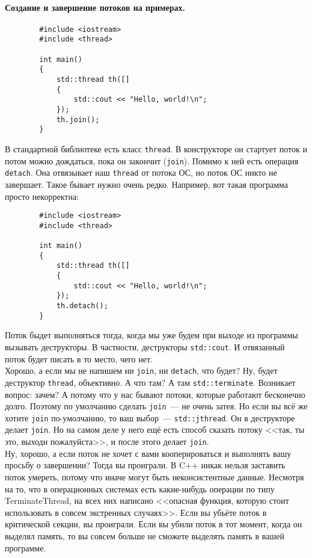 \documentclass{article}
\begin{document}
    \paragraph{Создание и завершение потоков на примерах.}
    \begin{verbatim}
        #include <iostream>
        #include <thread>

        int main()
        {
            std::thread th([]
            {
                std::cout << "Hello, world!\n";
            });
            th.join();
        }
    \end{verbatim}
    В стандартной библиотеке есть класс \texttt{thread}. В конструкторе он стартует поток и потом можно дождаться, пока он закончит (\texttt{join}). Помимо к ней есть операция \texttt{detach}. Она отвязывает наш \texttt{thread} от потока ОС, но поток ОС никто не завершает. Такое бывает нужно очень редко. Например, вот такая программа просто некорректна:
    \begin{verbatim}
        #include <iostream>
        #include <thread>
        
        int main()
        {
            std::thread th([]
            {
                std::cout << "Hello, world!\n";
            });
            th.detach();
        }
    \end{verbatim}
    Поток быдет выполняться тогда, когда мы уже будем при выходе из программы вызывать деструкторы. В частности, деструкторы \texttt{std::cout}. И отвязанный поток будет писать в то место, чего нет.\\
    Хорошо, а если мы не напишем ни \texttt{join}, ни \texttt{detach}, что будет? Ну, будет деструктор \texttt{thread}, объективно. А что там? А там \texttt{std::terminate}. Возникает вопрос: зачем? А потому что у нас бывают потоки, которые работают бесконечно долго. Поэтому по умолчанию сделать \texttt{join}~--- не очень затея. Но если вы всё же хотите \texttt{join} по-умолчанию, то ваш выбор~--- \texttt{std::jthread}. Он в деструкторе делает \texttt{join}. Но на самом деле у него ещё есть способ сказать потоку <<так, ты это, выходи пожалуйста>>, и после этого делает \texttt{join}.\\
    Ну, хорошо, а если поток не хочет с вами кооперироваться и выполнять вашу просьбу о завершении? Тогда вы проиграли. В C++ никак нельзя заставить поток умереть, потому что иначе могут быть неконсистентные данные. Несмотря на то, что в операционных системах есть какие-нибудь операции по типу TerminateThread, на всех них написано <<опасная функция, которую стоит использовать в совсем экстренных случаях>>. Если вы убьёте поток в критической секции, вы проиграли. Если вы убили поток в тот момент, когда он выделял память, то вы совсем больше не сможете выделять память в вашей программе.
\end{document}
